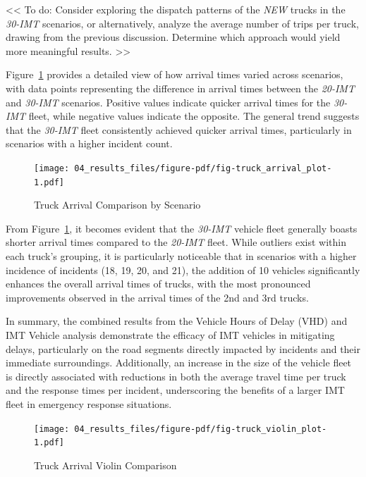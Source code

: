 \documentclass[fancy, oneside, mastersfancy, ms]{byuthesis}
\begin{document}
\textless\textless{} To do: Consider exploring the dispatch patterns of
the \emph{NEW} trucks in the \emph{30-IMT} scenarios, or alternatively,
analyze the average number of trips per truck, drawing from the previous
discussion. Determine which approach would yield more meaningful
results. \textgreater\textgreater{}

Figure~\ref{fig-truck_arrival_plot} provides a detailed view of how
arrival times varied across scenarios, with data points representing the
difference in arrival times between the \emph{20-IMT} and \emph{30-IMT}
scenarios. Positive values indicate quicker arrival times for the
\emph{30-IMT} fleet, while negative values indicate the opposite. The
general trend suggests that the \emph{30-IMT} fleet consistently
achieved quicker arrival times, particularly in scenarios with a higher
incident count.

\begin{figure}

{\centering \texttt{[image: 04\_results\_files/figure-pdf/fig-truck\_arrival\_plot-1.pdf]}

}

\caption{\label{fig-truck_arrival_plot}Truck Arrival Comparison by
Scenario}

\end{figure}

From Figure~\ref{fig-truck_arrival_plot}, it becomes evident that the
\emph{30-IMT} vehicle fleet generally boasts shorter arrival times
compared to the \emph{20-IMT} fleet. While outliers exist within each
truck's grouping, it is particularly noticeable that in scenarios with a
higher incidence of incidents (18, 19, 20, and 21), the addition of 10
vehicles significantly enhances the overall arrival times of trucks,
with the most pronounced improvements observed in the arrival times of
the 2nd and 3rd trucks.

In summary, the combined results from the Vehicle Hours of Delay (VHD)
and IMT Vehicle analysis demonstrate the efficacy of IMT vehicles in
mitigating delays, particularly on the road segments directly impacted
by incidents and their immediate surroundings. Additionally, an increase
in the size of the vehicle fleet is directly associated with reductions
in both the average travel time per truck and the response times per
incident, underscoring the benefits of a larger IMT fleet in emergency
response situations.

\begin{figure}

{\centering \texttt{[image: 04\_results\_files/figure-pdf/fig-truck\_violin\_plot-1.pdf]}

}

\caption{\label{fig-truck_violin_plot}Truck Arrival Violin Comparison}

\end{figure}
\end{document}
